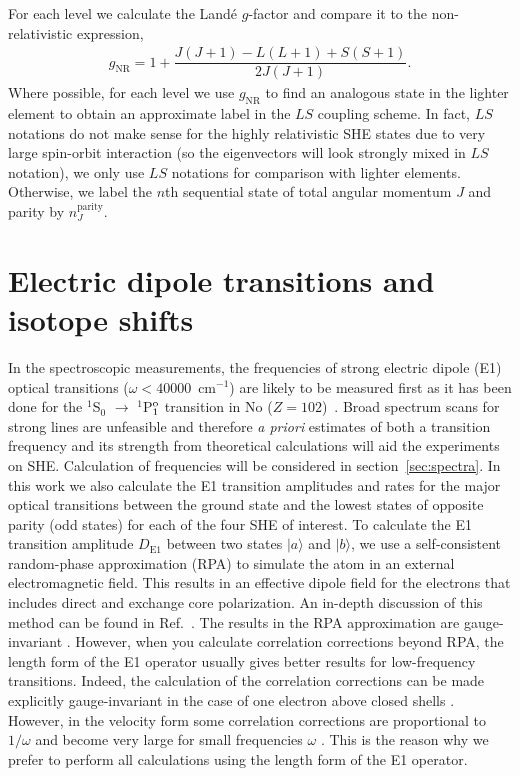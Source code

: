 \documentclass[8pt,a4paper, twoside]{report}
\begin{document}
For each level we calculate the Land\'{e} $g$-factor and compare it to the non-relativistic expression,
\begin{align} \label{eq:Lande}
g_{\text{NR}} =  1 + \dfrac{J(J + 1) - L(L+1) + S(S+1)}{2J(J+1)}.
\end{align}
Where possible, for each level we use $g_{\text{NR}}$ to find an analogous state in the lighter element to obtain an approximate label in the $LS$ coupling scheme. In fact, $LS$ notations do not make sense for the highly relativistic SHE states due to very large spin-orbit interaction (so the eigenvectors will look strongly mixed in $LS$ notation), we only use $LS$ notations for comparison with lighter elements. Otherwise, we label the $n$th sequential state of total angular momentum $J$ and parity by $n_{J}^{\text{parity}}$.


\section{Electric dipole transitions and isotope shifts} \label{sec:Isoshift}

In the spectroscopic measurements, the frequencies of strong electric dipole (E1) optical transitions ($\omega < 40 000$~cm$^{-1}$) are likely to be measured first as it has been done for the $^1$S$_0$ $\rightarrow$ $^1$P$_1^{\rm o}$ transition in No ($Z=102$)~\cite{Laatiaoui2016}. Broad spectrum scans for strong lines are unfeasible and therefore \textit{a priori} estimates of both a transition frequency and its strength from theoretical calculations will aid the experiments on SHE. Calculation of frequencies will be considered in section~\ref{sec:spectra}. In this work we also calculate the E1 transition amplitudes and rates for the major optical  transitions between the ground state and the  lowest states of opposite parity (odd states) for each of the four SHE of interest. 
\linebreak
To calculate the E1 transition amplitude $D_{\text{E1}}$ between two states $|a\rangle$ and $|b\rangle$, we use a self-consistent random-phase approximation (RPA) to simulate the atom in an external electromagnetic field. This results in an effective dipole field for the electrons that includes direct and exchange core polarization. An in-depth discussion of this method can be found in Ref.~\cite{DFSS1986, Dzuba2018}. The results in the  RPA approximation are gauge-invariant \cite{DFSS1986}. However, when you calculate correlation corrections beyond RPA, the length form of the E1 operator usually gives better results for low-frequency transitions. Indeed, the calculation of the correlation corrections can be made explicitly gauge-invariant in the case of one electron above closed shells \cite{DFSS1987_2, DFSS1987}. However, in the velocity form some correlation corrections are proportional to $1/\omega$ and become very large for small frequencies $\omega$  \cite{DFSS1987_2, DFSS1987}. This is the reason why we prefer to perform all calculations using the length form of the E1 operator. \\
\end{document}
